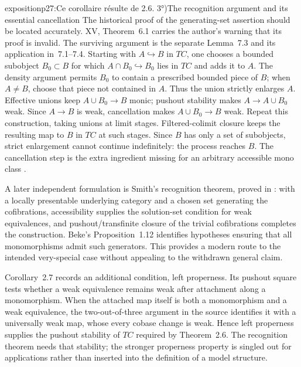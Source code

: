 \begin{dcomment}{exposition}{p27:Ce corollaire résulte de 2.6. 3°)}{The recognition argument and its essential cancellation}
The historical proof of the generating-set assertion should be located accurately. XV, Theorem~6.1 carries the author's warning that its proof is invalid. The surviving argument is the separate Lemma~7.3 and its application in~7.1--7.4. Starting with $A\hookrightarrow B$ in $TC$, one chooses a bounded subobject $B_0\subset B$ for which $A\cap B_0\hookrightarrow B_0$ lies in $TC$ and adds it to $A$. The density argument permits $B_0$ to contain a prescribed bounded piece of $B$; when $A\ne B$, choose that piece not contained in $A$. Thus the union strictly enlarges $A$. Effective unions keep $A\cup B_0\to B$ monic; pushout stability makes $A\to A\cup B_0$ weak. Since $A\to B$ is weak, cancellation makes $A\cup B_0\to B$ weak. Repeat this construction, taking unions at limit stages. Filtered-colimit closure keeps the resulting map to $B$ in $TC$ at such stages. Since $B$ has only a set of subobjects, strict enlargement cannot continue indefinitely: the process reaches $B$. The cancellation step is the extra ingredient missing for an arbitrary accessible mono class \citep[§7, especially Lemma~7.3 and Corollary~7.4]{Grothendieck1990XV}.

A later independent formulation is Smith's recognition theorem, proved in \citet[Theorem~1.7]{Beke2000}: with a locally presentable underlying category and a chosen set generating the cofibrations, accessibility supplies the solution-set condition for weak equivalences, and pushout/transfinite closure of the trivial cofibrations completes the construction. Beke's Proposition~1.12 identifies hypotheses ensuring that all monomorphisms admit such generators. This provides a modern route to the intended very-special case without appealing to the withdrawn general claim.

Corollary~2.7 records an additional condition, left properness. Its pushout square tests whether a weak equivalence remains weak after attachment along a monomorphism. When the attached map itself is both a monomorphism and a weak equivalence, the two-out-of-three argument in the source identifies it with a universally weak map, whose every cobase change is weak. Hence left properness supplies the pushout stability of $TC$ required by Theorem~2.6. The recognition theorem needs that stability; the stronger properness property is singled out for applications rather than inserted into the definition of a model structure.
\end{dcomment}



